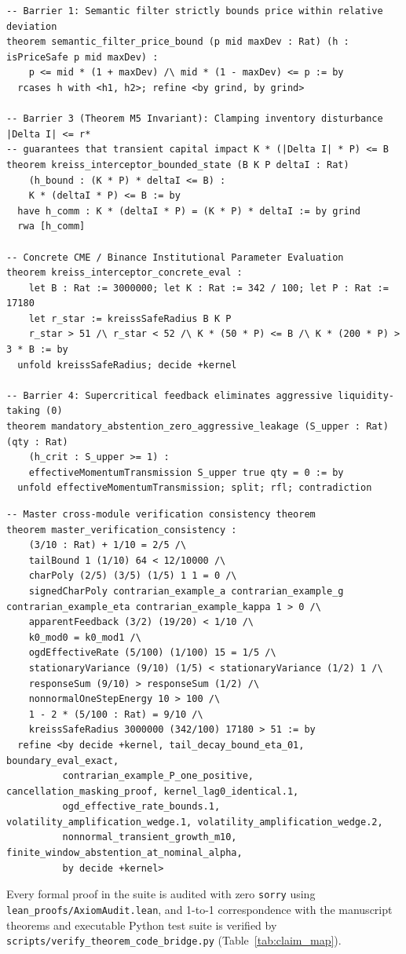 \documentclass[10pt,twocolumn,letterpaper]{article}
\theoremstyle{definition}
\theoremstyle{remark}
\begin{document}
\begin{lstlisting}[language={}, numbers=none, caption={Listing C.3: AMIP RFC-001 AgenticGuard Zero-Trust Interceptor and Solvency Invariants in \texttt{lean\_proofs/Proofs/AgenticGuard.lean}.}, label={lst:lean4_agentic_guard}]
-- Barrier 1: Semantic filter strictly bounds price within relative deviation
theorem semantic_filter_price_bound (p mid maxDev : Rat) (h : isPriceSafe p mid maxDev) :
    p <= mid * (1 + maxDev) /\ mid * (1 - maxDev) <= p := by
  rcases h with <h1, h2>; refine <by grind, by grind>

-- Barrier 3 (Theorem M5 Invariant): Clamping inventory disturbance |Delta I| <= r*
-- guarantees that transient capital impact K * (|Delta I| * P) <= B
theorem kreiss_interceptor_bounded_state (B K P deltaI : Rat)
    (h_bound : (K * P) * deltaI <= B) :
    K * (deltaI * P) <= B := by
  have h_comm : K * (deltaI * P) = (K * P) * deltaI := by grind
  rwa [h_comm]

-- Concrete CME / Binance Institutional Parameter Evaluation
theorem kreiss_interceptor_concrete_eval :
    let B : Rat := 3000000; let K : Rat := 342 / 100; let P : Rat := 17180
    let r_star := kreissSafeRadius B K P
    r_star > 51 /\ r_star < 52 /\ K * (50 * P) <= B /\ K * (200 * P) > 3 * B := by
  unfold kreissSafeRadius; decide +kernel

-- Barrier 4: Supercritical feedback eliminates aggressive liquidity-taking (0)
theorem mandatory_abstention_zero_aggressive_leakage (S_upper : Rat) (qty : Rat)
    (h_crit : S_upper >= 1) :
    effectiveMomentumTransmission S_upper true qty = 0 := by
  unfold effectiveMomentumTransmission; split; rfl; contradiction
\end{lstlisting}

\begin{lstlisting}[language={}, numbers=none, caption={Listing C.4: Master Verification Consistency Theorem in \texttt{lean\_proofs/Proofs.lean}.}, label={lst:lean4_master}]
-- Master cross-module verification consistency theorem
theorem master_verification_consistency :
    (3/10 : Rat) + 1/10 = 2/5 /\
    tailBound 1 (1/10) 64 < 12/10000 /\
    charPoly (2/5) (3/5) (1/5) 1 1 = 0 /\
    signedCharPoly contrarian_example_a contrarian_example_g contrarian_example_eta contrarian_example_kappa 1 > 0 /\
    apparentFeedback (3/2) (19/20) < 1/10 /\
    k0_mod0 = k0_mod1 /\
    ogdEffectiveRate (5/100) (1/100) 15 = 1/5 /\
    stationaryVariance (9/10) (1/5) < stationaryVariance (1/2) 1 /\
    responseSum (9/10) > responseSum (1/2) /\
    nonnormalOneStepEnergy 10 > 100 /\
    1 - 2 * (5/100 : Rat) = 9/10 /\
    kreissSafeRadius 3000000 (342/100) 17180 > 51 := by
  refine <by decide +kernel, tail_decay_bound_eta_01, boundary_eval_exact,
          contrarian_example_P_one_positive, cancellation_masking_proof, kernel_lag0_identical.1,
          ogd_effective_rate_bounds.1, volatility_amplification_wedge.1, volatility_amplification_wedge.2,
          nonnormal_transient_growth_m10, finite_window_abstention_at_nominal_alpha,
          by decide +kernel>
\end{lstlisting}

Every formal proof in the suite is audited with zero \texttt{sorry} using \texttt{lean\_proofs/AxiomAudit.lean}, and 1-to-1 correspondence with the manuscript theorems and executable Python test suite is verified by \texttt{scripts/verify\_theorem\_code\_bridge.py} (Table~\ref{tab:claim_map}).
\end{document}
